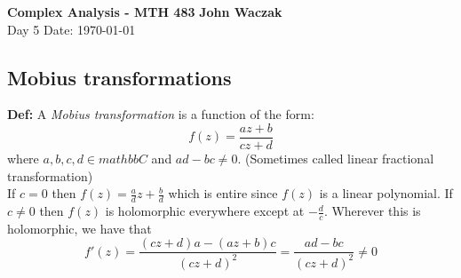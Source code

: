 \documentclass[a4paper, 11pt]{article}
\begin{document}
\noindent
\large\textbf{Complex Analysis - MTH 483} \hfill \textbf{John Waczak} \\
\normalsize Day 5 \hfill  Date: \today \\

\subsection*{Mobius transformations} 
	\textbf{Def:} A \textit{Mobius transformation} is a function of the form:
		$$ f(z) = \frac{az+b}{cz+d} $$
	where $a,b,c,d \in mathbb{C}$ and $ad-bc\neq0$. (Sometimes called linear fractional transformation) \\ 
	
	\noindent If $c=0$ then $f(z) = \frac{a}{d}z + \frac{b}{d}$ which is entire since $f(z)$ is a linear polynomial. If $c\neq 0$ then $f(z)$ is holomorphic everywhere except at $-\frac{d}{c}$. Wherever this is holomorphic, we have that 
		$$f'(z) = \frac{(cz+d)a - (az+b)c}{(cz+d)^2} = \frac{ad-bc}{(cz+d)^2} \neq 0$$ 
	
\end{document}

